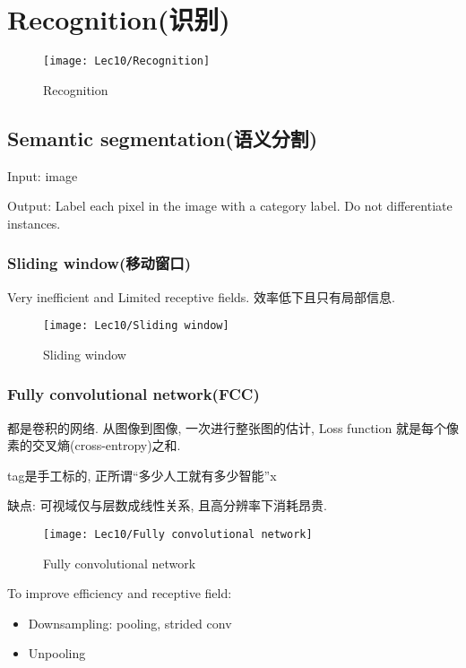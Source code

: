 \chapter{Recognition(识别)}

\begin{figure}[H]
    \centering
    \texttt{[image: Lec10/Recognition]}
    \caption{Recognition}
\end{figure}


\section{Semantic segmentation(语义分割)}
Input: image

Output: Label each pixel in the image with a category label. Do not differentiate instances. 

\subsection{Sliding window(移动窗口)}
Very inefficient and Limited receptive fields. 效率低下且只有局部信息.  

\begin{figure}[H]
    \centering
    \texttt{[image: Lec10/Sliding window]}
    \caption{Sliding window}
\end{figure}

\subsection{Fully convolutional network(FCC)}
都是卷积的网络. 从图像到图像, 一次进行整张图的估计, Loss function 就是每个像素的交叉熵(cross-entropy)之和. 

tag是手工标的, 正所谓``多少人工就有多少智能''x

缺点: 可视域仅与层数成线性关系, 且高分辨率下消耗昂贵. 

\begin{figure}[H]
    \centering
    \texttt{[image: Lec10/Fully convolutional network]}
    \caption{Fully convolutional network}
\end{figure}

To improve efficiency and receptive field: 
\begin{itemize}
    \item Downsampling: pooling, strided conv
    \item Unpooling
\end{itemize}

